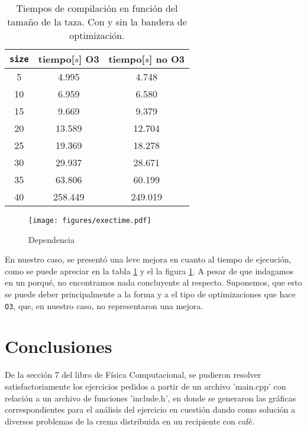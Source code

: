 \documentclass{article}
\begin{document}
\begin{table}[h!]
    \centering
    \begin{tabular}{ccc}\toprule
        \texttt{size} & tiempo[$s$] O3 & tiempo[$s$] no O3 \\\midrule
        5   &	4.995 	&  4.748 \\\midrule
        10	&    6.959   &	6.580 \\\midrule
        15	&    9.669   &   9.379 \\\midrule
        20	&    13.589  &   12.704 \\\midrule
        25	&    19.369  &   18.278 \\\midrule
        30	&    29.937  &   28.671 \\\midrule
        35	&    63.806  &   60.199 \\\midrule
        40  &    258.449	&  249.019 \\\midrule
    \end{tabular}
    \caption{Tiempos de compilación en función del tamaño de la taza. Con y sin la bandera de optimización.}
    \label{time}
\end{table}

\newpage

\begin{figure}[h!]
    \centering
        \texttt{[image: figures/exectime.pdf]}
    \caption{Dependencia}
    \label{exectime}
\end{figure}

En nuestro caso, se presentó una leve mejora en cuanto al tiempo de ejecución, como se puede apreciar en la tabla \ref{time} y el la figura \ref{exectime}. A pesar de que indagamos en un porqué, no encontramos nada concluyente al respecto. Suponemos, que esto se puede deber principalmente a la forma y a el tipo de optimizaciones que hace \texttt{O3}, que, en nuestro caso, no representaron una mejora.

\section*{Conclusiones}
De la sección 7 del libro de Física Computacional, se pudieron resolver satisfactoriamente los ejercicios pedidos a partir de un archivo 'main.cpp' con relación a un archivo de funciones 'include.h', en donde se generaron las gráficas correspondientes para el análisis del ejercicio en cuestión dando como solución a diversos problemas de la crema distribuida en un recipiente con café.



\end{document}
